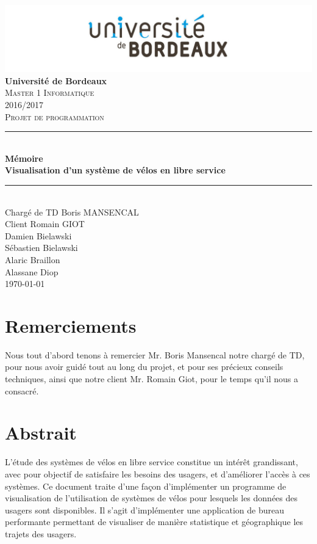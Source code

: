 \documentclass[12pt]{article}
\begin{document}
	\begin{titlepage}
		\includegraphics[scale=0.2]{logo_bordeaux.png}\\
		\centering
		\linebreak
		{\LARGE \bfseries Université de Bordeaux}\\ [2cm]
		\textsc{\Large Master 1 Informatique}\\ [0,3cm]
		\textsc{\Large 2016/2017}\\ [1,4cm]

		\textsc{\Large Projet de programmation}\\ [1.4cm]

		\rule{16cm}{1mm}\\ [0,7cm]
		{\huge \bfseries Mémoire}\\ [0,5cm]
		{\huge \bfseries Visualisation d'un système de vélos en libre service} \\[0,7cm]
		\rule{16cm}{1mm}\\ [1cm]

		{\Large Chargé de TD Boris MANSENCAL }\\ [0,3cm]
		{\Large Client Romain GIOT }\\ [1cm]

		{\Large Damien Bielawski }\\ [0,3cm]
		{\Large Sébastien Bielawski }\\[0,3cm]
		{\Large Alaric Braillon }\\ [0,3cm]
		{\Large Alassane Diop }\\ [2cm]
		\Large\today

	\end{titlepage}

\newpage
\section*{Remerciements} 
	Nous tout d'abord tenons à remercier Mr. Boris Mansencal notre chargé de TD, pour nous avoir guidé tout au long du projet, et pour ses précieux conseils techniques, ainsi que notre client Mr. Romain Giot, pour le temps qu'il nous a consacré.	
	
\newpage
\section*{Abstrait}
	L’étude des systèmes de vélos en libre service constitue un intérêt grandissant, avec pour objectif de satisfaire les besoins des usagers, et d’améliorer l'accès à ces systèmes. Ce document traite d’une façon d’implémenter un programme de visualisation de l’utilisation de systèmes de vélos pour lesquels les données des usagers sont disponibles. Il s’agit d’implémenter une application de bureau performante permettant de visualiser de manière statistique et géographique les trajets des usagers.
\end{document}
